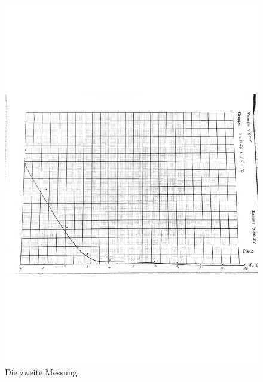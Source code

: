 \begin{figure}
    \centering
    \includegraphics[width=\linewidth]{pictures/kurve2.pdf}
    \caption{Die zweite Messung.}
    \label{fig:kurve2}
\end{figure}

